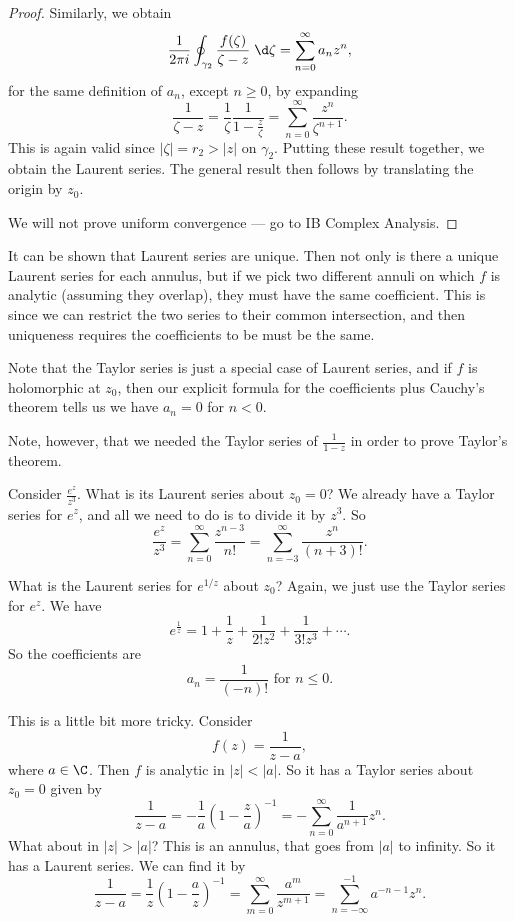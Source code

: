 \documentclass[a4paper]{article}
\begin{document}
\begin{proof}
  Similarly, we obtain
  \[
    \frac{1}{2\pi i} \oint_{\gamma_2} \frac{f(\zeta)}{\zeta - z}\;\d \zeta = \sum_{n = 0}^\infty a_n z^n,
  \]
  for the same definition of $a_n$, except $n \geq 0$, by expanding
  \[
    \frac{1}{\zeta - z} = \frac{1}{\zeta} \frac{1}{1 - \frac{z}{\zeta}} = \sum_{n = 0}^\infty \frac{z^n}{\zeta^{n + 1}}.
  \]
  This is again valid since $|\zeta| = r_2 > |z|$ on $\gamma_2$. Putting these result together, we obtain the Laurent series. The general result then follows by translating the origin by $z_0$.

  We will not prove uniform convergence --- go to IB Complex Analysis.
\end{proof}
It can be shown that Laurent series are unique. Then not only is there a unique Laurent series for each annulus, but if we pick two different annuli on which $f$ is analytic (assuming they overlap), they must have the same coefficient. This is since we can restrict the two series to their common intersection, and then uniqueness requires the coefficients to be must be the same.

Note that the Taylor series is just a special case of Laurent series, and if $f$ is holomorphic at $z_0$, then our explicit formula for the coefficients plus Cauchy's theorem tells us we have $a_n = 0$ for $n < 0$.

Note, however, that we needed the Taylor series of $\frac{1}{1 - z}$ in order to prove Taylor's theorem.

\begin{eg}
  Consider $\frac{e^z}{z^3}$. What is its Laurent series about $z_0 = 0$? We already have a Taylor series for $e^z$, and all we need to do is to divide it by $z^3$. So
  \[
    \frac{e^z}{z^3} = \sum_{n = 0}^\infty \frac{z^{n - 3}}{n!} = \sum_{n = -3}^{\infty} \frac{z^n}{(n + 3)!}.
  \]
\end{eg}

\begin{eg}
  What is the Laurent series for $e^{1/z}$ about $z_0$? Again, we just use the Taylor series for $e^z$. We have
  \[
    e^{\frac{1}{z}} = 1 + \frac{1}{z} + \frac{1}{2! z^2} + \frac{1}{3! z^3} + \cdots.
  \]
  So the coefficients are
  \[
    a_n = \frac{1}{(-n)!}\text{ for }n \leq 0.
  \]
\end{eg}

\begin{eg}
  This is a little bit more tricky. Consider
  \[
    f(z) = \frac{1}{z - a},
  \]
  where $a \in \C$. Then $f$ is analytic in $|z| < |a|$. So it has a Taylor series about $z_0 = 0$ given by
  \[
    \frac{1}{z - a} = -\frac{1}{a}\left(1 - \frac{z}{a}\right)^{-1} = -\sum_{n = 0}^\infty \frac{1}{a^{n + 1}} z^n.
  \]
  What about in $|z| > |a|$? This is an annulus, that goes from $|a|$ to infinity. So it has a Laurent series. We can find it by
  \[
    \frac{1}{z - a} = \frac{1}{z} \left(1 - \frac{a}{z}\right)^{-1} = \sum_{m = 0}^\infty \frac{a^m}{z^{m + 1}} = \sum_{n = -\infty}^{-1} a^{-n - 1} z^n.
  \]
\end{eg}
\end{document}
